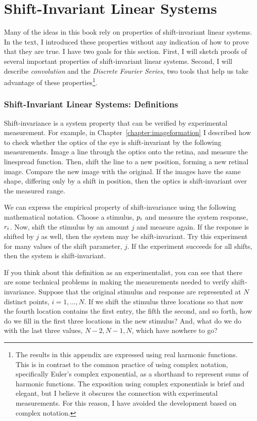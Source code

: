 \chapter{Shift-Invariant Linear Systems}
\label{chapter:sil}
Many of the ideas in this book rely on properties of shift-invariant
linear systems.  In the text, I introduced these properties without
any indication of how to prove that they are true.  I have two goals
for this section.  First, I will sketch proofs of several important
properties of shift-invariant linear systems.  Second, I will describe
{\em convolution} and the {\em Discrete Fourier Series}, two tools
that help us take advantage of these properties\footnote{The results
in this appendix are expressed using real harmonic functions.  This is
in contrast to the common practice of using complex notation,
specifically Euler's complex exponential, as a shorthand to represent
sums of harmonic functions.  The exposition using complex exponentials
is brief and elegant, but I believe it obscures the connection with
experimental measurements.  For this reason, I have avoided the
development based on complex notation.}.

\subsection*{Shift-Invariant Linear Systems:  Definitions}
Shift-invariance is a system property that can be verified by
experimental measurement.  For example, in
Chapter~\ref{chapter:imageformation} I described how to check whether
the optics of the eye is shift-invariant by the following
measurements.  Image a line through the optics onto the retina, and
measure the linespread function.  Then, shift the line to a new
position, forming a new retinal image.  Compare the new image with the
original.  If the images have the same shape, differing only by a
shift in position, then the optics is shift-invariant over the
measured range.

We can express the empirical property of shift-invariance using the
following mathematical notation.  Choose a stimulus, $\mbox{$p_{i}$}$ and
measure the system response, $\mbox{$r_{i}$}$.  Now, shift the stimulus
by an amount $j$ and measure again.  If the response is shifted by $j$
as well, then the system may be shift-invariant.  Try this experiment for
many values of the shift parameter, $j$.  If the experiment succeeds
for all shifts, then the system is shift-invariant.

If you think about this definition as an experimentalist, you can see
that there are some technical problems in making the measurements
needed to verify shift-invariance.  Suppose that the original stimulus
and response are represented at $N$ distinct points, $i = 1, \ldots,
N$.  If we shift the stimulus three locations so that now the fourth
location contains the first entry, the fifth the second, and so forth,
how do we fill in the first three locations in the new stimulus?  And,
what do we do with the last three values, $N-2, N-1, N$, which have
nowhere to go?

